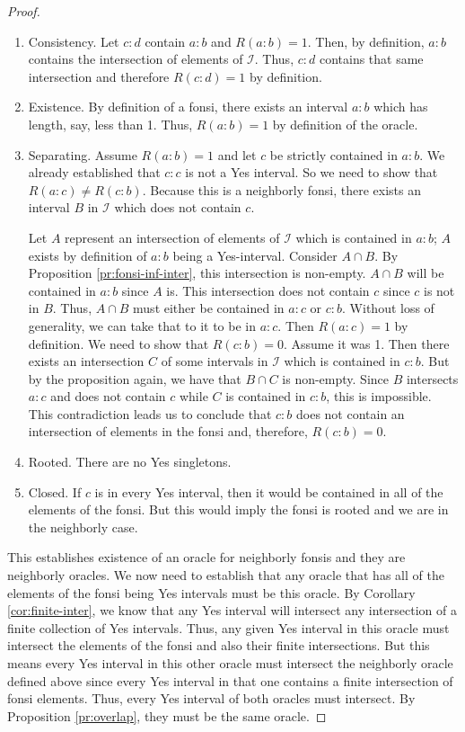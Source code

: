 \documentclass[12pt]{article}
\begin{document}
\begin{proof}
\begin{enumerate}
    \item Consistency. Let $c:d$ contain $a:b$ and $R(a:b)=1$. Then, by definition, $a:b$ contains the intersection of elements of $\mathcal{I}$. Thus, $c:d$ contains that same intersection and therefore $R(c:d)=1$ by definition. 
    \item Existence. By definition of a fonsi, there exists an interval $a:b$ which has length, say,  less than 1. Thus, $R(a:b)=1$ by definition of the oracle.
    \item Separating. Assume $R(a:b)=1$ and let $c$ be strictly contained in $a:b$. We already established that $c:c$ is not a Yes interval. So we need to show that $R(a:c) \neq R(c:b)$. Because this is a neighborly fonsi, there exists an interval $B$ in $\mathcal{I}$ which does not contain $c$. 
    
    Let $A$ represent an intersection of elements of $\mathcal{I}$ which is contained in $a:b$; $A$ exists by definition of $a:b$ being a Yes-interval.   Consider $A \cap B$. By Proposition \ref{pr:fonsi-inf-inter}, this intersection is non-empty. $A \cap B$ will be contained in $a:b$ since $A$ is.  This intersection does not contain $c$ since $c$ is not in $B$. Thus, $A \cap B$ must either be contained in $a:c$ or $c:b$. Without loss of generality, we can take that to it to be in $a:c$. Then $R(a:c) = 1$ by definition. We need to show that $R(c:b) = 0$. Assume it was 1. Then there exists an intersection $C$ of some intervals in $\mathcal{I}$ which is contained in $c:b$. But by the proposition again, we have that $B \cap C$ is non-empty. Since $B$ intersects $a:c$ and does not contain $c$ while $C$ is contained in $c:b$, this is impossible. This contradiction leads us to conclude that $c:b$ does not contain an intersection of elements in the fonsi and, therefore, $R(c:b) = 0$.
    \item Rooted. There are no Yes singletons. 
    \item Closed. If $c$ is in every Yes interval, then it would be contained in all of the elements of the fonsi. But this would imply the fonsi is rooted and we are in the neighborly case. 
\end{enumerate}

This establishes existence of an oracle for neighborly fonsis and they are neighborly oracles. We now need to establish that any oracle that has all of the elements of the fonsi being Yes intervals must be this oracle. By Corollary \ref{cor:finite-inter}, we know that any Yes interval will intersect any intersection of a finite collection of Yes intervals. Thus, any given Yes interval in this oracle must intersect the elements of the fonsi and also their finite intersections. But this means every Yes interval in this other oracle must intersect the neighborly oracle defined above since every Yes interval in that one contains a finite intersection of fonsi elements. Thus, every Yes interval of both oracles must intersect. By Proposition \ref{pr:overlap}, they must be the same oracle. 
\end{proof}
\end{document}
